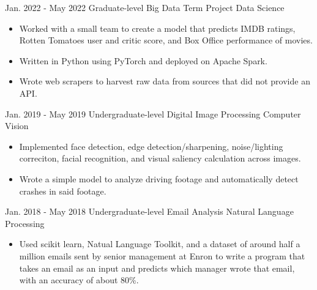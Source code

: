 \documentclass[8pt]{resumeclass}
\begin{document}


\begin{entrylist}
	\entry
		{Jan. 2022 - May 2022}
		{Graduate-level Big Data Term Project}
		{Data Science}
		{\vspace{-4mm}\begin{itemize}[noitemsep,nolistsep]
			\small
			\item Worked with a small team to create a model that predicts IMDB ratings, Rotten Tomatoes user and critic score, and Box Office performance of movies.
			\item Written in Python using PyTorch and deployed on Apache Spark.
			\item Wrote web scrapers to harvest raw data from sources that did not provide an API.
		\end{itemize}}
	\entry
		{Jan. 2019 - May 2019}
		{Undergraduate-level Digital Image Processing}
		{Computer Vision}
		{{\vspace{-4mm}\begin{itemize}[noitemsep,nolistsep]
			\small
			\item Implemented face detection, edge detection/sharpening, noise/lighting correciton, facial recognition, and visual saliency calculation across images.
			\item Wrote a simple model to analyze driving footage and automatically detect crashes in said footage.
		\end{itemize}}}
	\entry
		{Jan. 2018 - May 2018}
		{Undergraduate-level Email Analysis}
		{Natural Language Processing}
		{{\vspace{-4mm}\begin{itemize}[noitemsep,nolistsep]
			\small
			\item Used scikit learn, Natual Language Toolkit, and a dataset of around half a million emails sent by senior management at Enron to write a program that takes an email as an input and predicts which manager wrote that email, with an accuracy of about 80\%.
		\end{itemize}}}
\end{entrylist}

\end{document}
